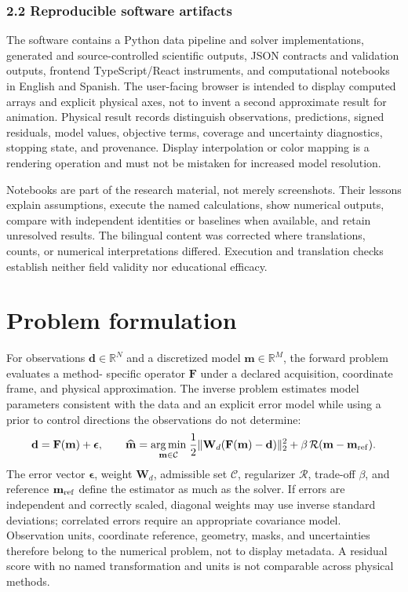 \subsubsection{2.2 Reproducible software
artifacts}\label{reproducible-software-artifacts}

The software contains a Python data pipeline and solver implementations,
generated and source-controlled scientific outputs, JSON contracts and
validation outputs, frontend TypeScript/React instruments, and
computational notebooks in English and Spanish. The user-facing browser
is intended to display computed arrays and explicit physical axes, not
to invent a second approximate result for animation. Physical result
records distinguish observations, predictions, signed residuals, model
values, objective terms, coverage and uncertainty diagnostics, stopping
state, and provenance. Display interpolation or color mapping is a
rendering operation and must not be mistaken for increased model
resolution.

Notebooks are part of the research material, not merely screenshots.
Their lessons explain assumptions, execute the named calculations, show
numerical outputs, compare with independent identities or baselines when
available, and retain unresolved results. The bilingual content was
corrected where translations, counts, or numerical interpretations
differed. Execution and translation checks establish neither field
validity nor educational efficacy.

\section{Problem formulation}\label{problem-formulation}

For observations $\mathbf d\in\mathbb R^N$ and a discretized model
$\mathbf m\in\mathbb R^M$, the forward problem evaluates a method-
specific operator $\mathbf F$ under a declared acquisition, coordinate
frame, and physical approximation. The inverse problem estimates model
parameters consistent with the data and an explicit error model while
using a prior to control directions the observations do not determine:
\begin{equation}\label{eq:general-inverse}
 \mathbf d=\mathbf F(\mathbf m)+\boldsymbol\epsilon,\qquad
 \widehat{\mathbf m}=\underset{\mathbf m\in\mathcal C}{\arg\min}\;
 \frac{1}{2}\|\mathbf W_d(\mathbf F(\mathbf m)-\mathbf d)\|_2^2
 +\beta\,\mathcal R(\mathbf m-\mathbf m_{\rm ref}).
\end{equation}
The error vector $\boldsymbol\epsilon$, weight $\mathbf W_d$, admissible
set $\mathcal C$, regularizer $\mathcal R$, trade-off $\beta$, and
reference $\mathbf m_{\rm ref}$ define the estimator as much as the
solver. If errors are independent and correctly scaled, diagonal weights
may use inverse standard deviations; correlated errors require an
appropriate covariance model. Observation units, coordinate reference,
geometry, masks, and uncertainties therefore belong to the numerical
problem, not to display metadata. A residual score with no named
transformation and units is not comparable across physical methods.

